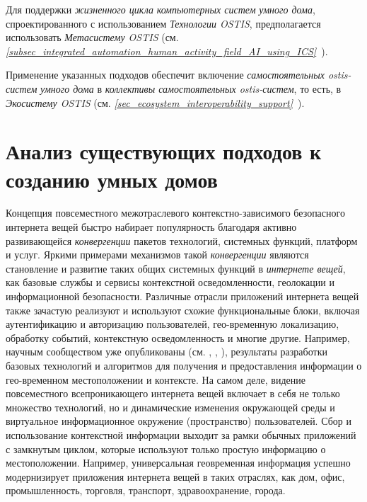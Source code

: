 Для поддержки \textit{жизненного цикла} \textit{компьютерных систем} \textit{умного дома}, спроектированного с использованием \textit{Технологии OSTIS}, предполагается использовать \textit{Метасистему OSTIS} (см. \textit{\ref{subsec_integrated_automation_human_activity_field_AI_using_ICS}~}).

Применение указанных подходов обеспечит включение \textit{самостоятельных ostis-систем} \textit{умного дома} в \textit{коллективы самостоятельных ostis-систем}, то есть, в \textit{Экосистему OSTIS} (см. \textit{\ref{sec_ecosystem_interoperability_support}~}).

\section{Анализ существующих подходов к созданию умных домов}
\label{sec_approach_analysis_for_smart_homes_design}

Концепция повсеместного межотраслевого контекстно-зависимого безопасного интернета вещей быстро набирает популярность благодаря активно развивающейся \textit{конвергенции} пакетов технологий, системных функций, платформ и услуг. Яркими примерами механизмов такой \textit{конвергенции} являются становление и развитие таких общих системных функций в \textit{интернете вещей}, как базовые службы и сервисы контекстной осведомленности, геолокации и информационной безопасности. Различные отрасли приложений интернета вещей также зачастую реализуют и используют схожие функциональные блоки, включая аутентификацию и авторизацию пользователей, гео-временную локализацию, обработку событий, контекстную осведомленность и многие другие. Например, научным сообществом уже опубликованы (см. , , ), результаты разработки базовых технологий и алгоритмов для получения и предоставления информации о гео-временном местоположении и контексте. На самом деле, видение повсеместного всепроникающего интернета вещей включает в себя не только множество технологий, но и динамические изменения окружающей среды и виртуальное информационное окружение (пространство) пользователей. Сбор и использование контекстной информации выходит за рамки обычных приложений с замкнутым циклом, которые используют только простую информацию о местоположении. Например, универсальная геовременная информация успешно модернизирует приложения интернета вещей в таких отраслях, как дом, офис, промышленность, торговля, транспорт, здравоохранение, города. 

